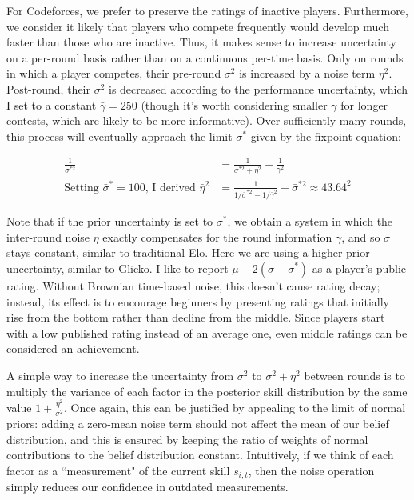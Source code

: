 \documentclass{article}
\begin{document}
For Codeforces, we prefer to preserve the ratings of inactive players. Furthermore, we consider it likely that players who compete frequently would develop much faster than those who are inactive. Thus, it makes sense to increase uncertainty on a per-round basis rather than on a continuous per-time basis. Only on rounds in which a player competes, their pre-round $\sigma^2$ is increased by a noise term $\eta^2$. Post-round, their $\sigma^2$ is decreased according to the performance uncertainty, which I set to a constant $\bar\gamma = 250$ (though it's worth considering smaller $\gamma$ for longer contests, which are likely to be more informative). Over sufficiently many rounds, this process will eventually approach the limit $\sigma^*$ given by the fixpoint equation:

\begin{align}
\frac{1}{\sigma^{*2}} &= \frac{1}{\sigma^{*2} + \eta^2} + \frac{1}{\gamma^2}
\\ \text{Setting }\bar\sigma^*=100\text{, I derived }\bar\eta^2 &= \frac{1}{1/\bar\sigma^{*2} - 1/\bar\gamma^2} - \bar\sigma^{*2} \approx 43.64^2
\end{align}

Note that if the prior uncertainty is set to $\sigma^*$, we obtain a system in which the inter-round noise $\eta$ exactly compensates for the round information $\gamma$, and so $\sigma$ stays constant, similar to traditional Elo. Here we are using a higher prior uncertainty, similar to Glicko. I like to report $\mu-2(\bar\sigma-\bar\sigma^*)$ as a player's public rating. Without Brownian time-based noise, this doesn't cause rating decay; instead, its effect is to encourage beginners by presenting ratings that initially rise from the bottom rather than decline from the middle. Since players start with a low published rating instead of an average one, even middle ratings can be considered an achievement.

A simple way to increase the uncertainty from $\sigma^2$ to $\sigma^2 + \eta^2$ between rounds is to multiply the variance of each factor in the posterior skill distribution by the same value $1 + \frac{\eta^2}{\sigma^2}$. Once again, this can be justified by appealing to the limit of normal priors: adding a zero-mean noise term should not affect the mean of our belief distribution, and this is ensured by keeping the ratio of weights of normal contributions to the belief distribution constant.  Intuitively, if we think of each factor as a ``measurement" of the current skill $s_{i,t}$, then the noise operation simply reduces our confidence in outdated measurements.
\end{document}
